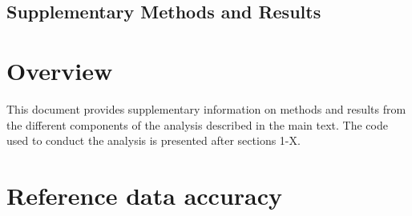 \documentclass[11pt, titlepage]{article}
\begin{document}
%

\setpagewiselinenumbers
\begin{center}\section*{\Large Supplementary Methods and Results}\end{center}
\section{\large Overview}
This document provides supplementary information on methods and results from the different components of the analysis described in the main text.  The code used to conduct the analysis is presented after sections 1-X.  

\section{\large Reference data accuracy}
\end{document}
